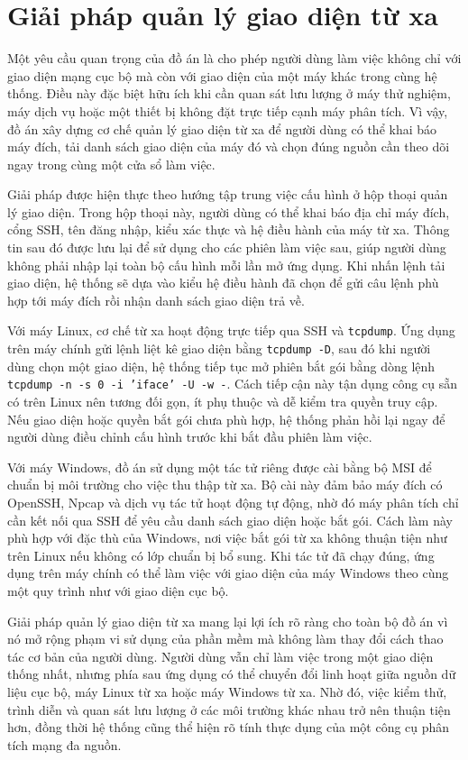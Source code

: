\documentclass[../DoAn.tex]{subfiles}
\begin{document}
\section{Giải pháp quản lý giao diện từ xa}
Một yêu cầu quan trọng của đồ án là cho phép người dùng làm việc không chỉ với giao diện mạng cục bộ mà còn với giao diện của một máy khác trong cùng hệ thống. Điều này đặc biệt hữu ích khi cần quan sát lưu lượng ở máy thử nghiệm, máy dịch vụ hoặc một thiết bị không đặt trực tiếp cạnh máy phân tích. Vì vậy, đồ án xây dựng cơ chế quản lý giao diện từ xa để người dùng có thể khai báo máy đích, tải danh sách giao diện của máy đó và chọn đúng nguồn cần theo dõi ngay trong cùng một cửa sổ làm việc.

Giải pháp được hiện thực theo hướng tập trung việc cấu hình ở hộp thoại quản lý giao diện. Trong hộp thoại này, người dùng có thể khai báo địa chỉ máy đích, cổng SSH, tên đăng nhập, kiểu xác thực và hệ điều hành của máy từ xa. Thông tin sau đó được lưu lại để sử dụng cho các phiên làm việc sau, giúp người dùng không phải nhập lại toàn bộ cấu hình mỗi lần mở ứng dụng. Khi nhấn lệnh tải giao diện, hệ thống sẽ dựa vào kiểu hệ điều hành đã chọn để gửi câu lệnh phù hợp tới máy đích rồi nhận danh sách giao diện trả về.

Với máy Linux, cơ chế từ xa hoạt động trực tiếp qua SSH và \texttt{tcpdump}. Ứng dụng trên máy chính gửi lệnh liệt kê giao diện bằng \texttt{tcpdump -D}, sau đó khi người dùng chọn một giao diện, hệ thống tiếp tục mở phiên bắt gói bằng dòng lệnh \texttt{tcpdump -n -s 0 -i 'iface' -U -w -}. Cách tiếp cận này tận dụng công cụ sẵn có trên Linux nên tương đối gọn, ít phụ thuộc và dễ kiểm tra quyền truy cập. Nếu giao diện hoặc quyền bắt gói chưa phù hợp, hệ thống phản hồi lại ngay để người dùng điều chỉnh cấu hình trước khi bắt đầu phiên làm việc.

Với máy Windows, đồ án sử dụng một tác tử riêng được cài bằng bộ MSI để chuẩn bị môi trường cho việc thu thập từ xa. Bộ cài này đảm bảo máy đích có OpenSSH, Npcap và dịch vụ tác tử hoạt động tự động, nhờ đó máy phân tích chỉ cần kết nối qua SSH để yêu cầu danh sách giao diện hoặc bắt gói. Cách làm này phù hợp với đặc thù của Windows, nơi việc bắt gói từ xa không thuận tiện như trên Linux nếu không có lớp chuẩn bị bổ sung. Khi tác tử đã chạy đúng, ứng dụng trên máy chính có thể làm việc với giao diện của máy Windows theo cùng một quy trình như với giao diện cục bộ.

Giải pháp quản lý giao diện từ xa mang lại lợi ích rõ ràng cho toàn bộ đồ án vì nó mở rộng phạm vi sử dụng của phần mềm mà không làm thay đổi cách thao tác cơ bản của người dùng. Người dùng vẫn chỉ làm việc trong một giao diện thống nhất, nhưng phía sau ứng dụng có thể chuyển đổi linh hoạt giữa nguồn dữ liệu cục bộ, máy Linux từ xa hoặc máy Windows từ xa. Nhờ đó, việc kiểm thử, trình diễn và quan sát lưu lượng ở các môi trường khác nhau trở nên thuận tiện hơn, đồng thời hệ thống cũng thể hiện rõ tính thực dụng của một công cụ phân tích mạng đa nguồn.
\end{document}
